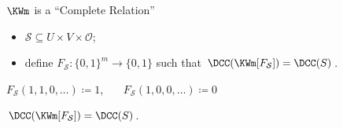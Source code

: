 \begin{frame}{$\KWm$ is a ``Complete Relation''}

    \begin{itemize}
        \item $\mathcal{S} \subseteq U \times V \times \mathcal{O}$;
        \item define $F_{\mathcal{S}}\colon \{0, 1\}^m \to \{0, 1\}$ such that
            $\DCC(\KWm[F_{\mathcal{S}}]) = \DCC(S)$.
    \end{itemize}

    \pause

    \vspace{-0.2cm}
    \begin{center}
        
    \end{center}

    \pause
    $F_{\mathcal{S}}(1, 1, 0, \dots) \coloneqq 1$\pause, ~~~$F_{\mathcal{S}}(1, 0, 0, \dots) \coloneqq 0$

    \pause
    \begin{lemma}
        $\DCC(\KWm[F_{\mathcal{S}}]) = \DCC(S)$.
    \end{lemma}

    \pause

\end{frame}